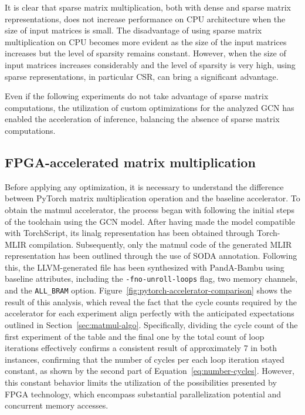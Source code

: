 It is clear that sparse matrix multiplication, both with dense and sparse matrix representations, does not increase performance on CPU architecture when the size of input matrices is small.
The disadvantage of using sparse matrix multiplication on CPU becomes more evident as the size of the input matrices increases but the level of sparsity remains constant.
However, when the size of input matrices increases considerably and the level of sparsity is very high, using sparse representations, in particular CSR, can bring a significant advantage.

Even if the following experiments do not take advantage of sparse matrix computations, the utilization of custom optimizations for the analyzed GCN has enabled the acceleration of inference, balancing the absence of sparse matrix computations.

\subsection{FPGA-accelerated matrix multiplication}
\label{subsec:optimization-comparison}%

Before applying any optimization, it is necessary to understand the difference between PyTorch matrix multiplication operation and the baseline accelerator.
To obtain the matmul accelerator, the process began with following the initial steps of the toolchain using the GCN model.
After having made the model compatible with TorchScript, its linalg representation has been obtained through Torch-MLIR compilation.
Subsequently, only the matmul code of the generated MLIR representation has been outlined through the use of SODA annotation.
Following this, the LLVM-generated file has been synthesized with PandA-Bambu using baseline attributes, including the \lstinline{-fno-unroll-loops} flag, two memory channels, and the \lstinline{ALL_BRAM} option.
Figure~\ref{fig:pytorch-accelerator-comparison} shows the result of this analysis, which reveal the fact that the cycle counts required by the accelerator for each experiment align perfectly with the anticipated expectations outlined in Section~\ref{sec:matmul-algo}.
Specifically, dividing the cycle count of the first experiment of the table and the final one by the total count of loop iterations effectively confirms a consistent result of approximately 7 in both instances, confirming that the number of cycles per each loop iteration stayed constant, as shown by the second part of Equation~\ref{eq:number-cycles}.
However, this constant behavior limits the utilization of the possibilities presented by FPGA technology, which encompass substantial parallelization potential and concurrent memory accesses.

